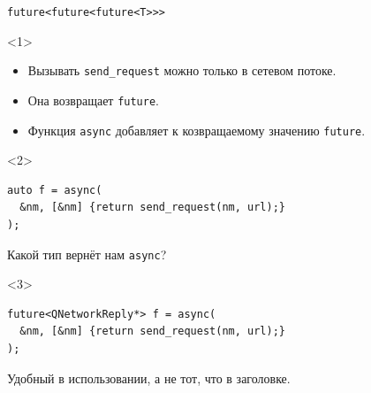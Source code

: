 \documentclass[aspectratio=169,hyperref={unicode},17pt]{beamer}
\begin{document}
\begin{frame}[fragile,t]{\texttt{future<future<future<T>{}>{}>}}
\begin{onlyenv}<1>
\begin{itemize}
 \item Вызывать \texttt{send\_request} можно только в сетевом потоке.
 \item Она возвращает \texttt{future}.
 \item Функция \texttt{async} добавляет к козвращаемому значению \texttt{future}.
\end{itemize}
\end{onlyenv}
\begin{onlyenv}<2>
\begin{lstlisting}[style=cppcode]
auto f = async(
  &nm, [&nm] {return send_request(nm, url);}
);
\end{lstlisting}
Какой тип вернёт нам \texttt{async}?
\end{onlyenv}
\begin{onlyenv}<3>
\begin{lstlisting}[style=cppcode]
future<QNetworkReply*> f = async(
  &nm, [&nm] {return send_request(nm, url);}
);
\end{lstlisting}
Удобный в использовании, а не тот, что в заголовке.
\end{onlyenv}
\end{frame}
\end{document}
